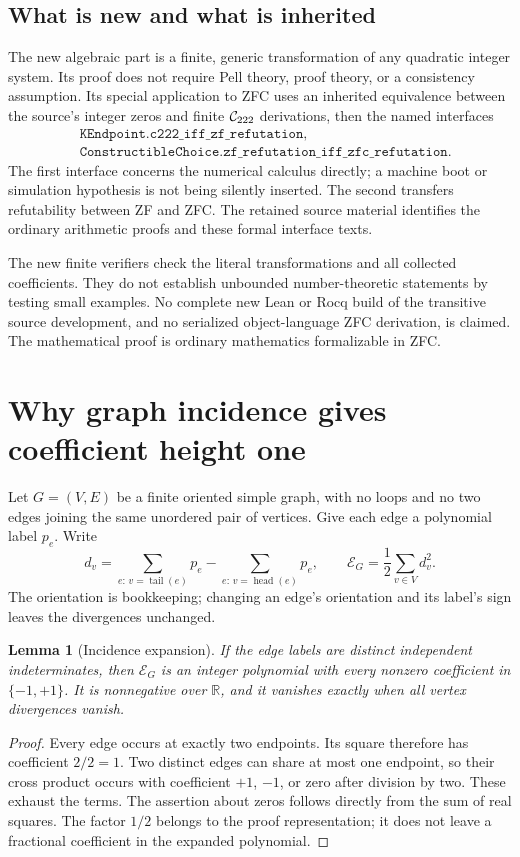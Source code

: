 \documentclass[11pt]{article}
\newtheorem{lemma}[theorem]{Lemma}
\theoremstyle{definition}\newtheorem{definition}[theorem]{Definition}
\theoremstyle{remark}\newtheorem{remark}[theorem]{Remark}
\begin{document}
\subsection{What is new and what is inherited}
The new algebraic part is a finite, generic transformation of any quadratic
integer system. Its proof does not require Pell theory, proof theory, or a
consistency assumption. Its special application to ZFC uses an inherited
equivalence between the source's integer zeros and finite $\mathcal C_{222}$ derivations,
then the named interfaces
\begin{align*}
 &\texttt{KEndpoint.c222\_iff\_zf\_refutation},\\
 &\texttt{ConstructibleChoice.zf\_refutation\_iff\_zfc\_refutation}.
\end{align*}
The first interface concerns the numerical calculus directly; a machine boot or
simulation hypothesis is not being silently inserted. The second transfers
refutability between ZF and ZFC. The retained source material identifies the
ordinary arithmetic proofs and these formal interface texts.

The new finite verifiers check the literal transformations and all collected
coefficients. They do not establish unbounded number-theoretic statements by
testing small examples. No complete new Lean or Rocq build of the transitive
source development, and no serialized object-language ZFC derivation, is
claimed. The mathematical proof is ordinary mathematics formalizable in ZFC.

\section{Why graph incidence gives coefficient height one}
\label{sec:graph}

Let $G=(V,E)$ be a finite oriented simple graph, with no loops and no two edges
joining the same unordered pair of vertices. Give each edge a polynomial label
$p_e$. Write
\[
 d_v=\sum_{e:\,v=\operatorname{tail}(e)}p_e
       -\sum_{e:\,v=\operatorname{head}(e)}p_e,
 \qquad
 \mathcal E_G=\frac12\sum_{v\in V}d_v^2.
\]
The orientation is bookkeeping; changing an edge's orientation and its label's
sign leaves the divergences unchanged.

\begin{lemma}[Incidence expansion]\label{lem:incidence}
If the edge labels are distinct independent indeterminates, then
$\mathcal E_G$ is an integer polynomial with every nonzero coefficient in
$\{-1,+1\}$. It is nonnegative over $\mathbb R$, and it vanishes exactly when
all vertex divergences vanish.
\end{lemma}
\begin{proof}
Every edge occurs at exactly two endpoints. Its square therefore has coefficient
$2/2=1$. Two distinct edges can share at most one endpoint, so their cross
product occurs with coefficient $+1$, $-1$, or zero after division by two.
These exhaust the terms. The assertion about zeros follows directly from the
sum of real squares. The factor $1/2$ belongs to the proof representation; it
does not leave a fractional coefficient in the expanded polynomial.
\end{proof}
\end{document}

